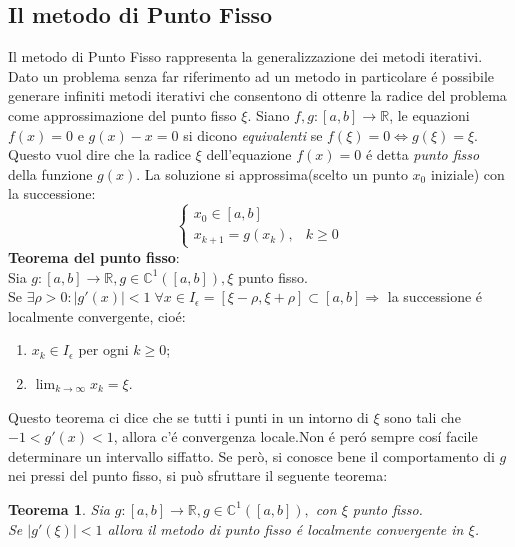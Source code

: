 \documentclass[12pt, letterpaper]{article}
\newtheorem{theorem}{Teorema}
\begin{document}
\subsection{Il metodo di Punto Fisso}
Il metodo di Punto Fisso rappresenta la generalizzazione dei metodi iterativi. Dato un problema senza far riferimento ad un metodo in particolare \'e possibile generare infiniti metodi iterativi che consentono di ottenre la radice del problema come approssimazione del punto fisso $\xi$.
Siano $f,g:[a,b] \to \mathbb{R}$, le equazioni $f(x)=0$ e $g(x)-x=0$ si dicono \textit{equivalenti} se $f(\xi)=0 \iff g(\xi) = \xi$. \\
Questo vuol dire che la radice $\xi$ dell'equazione $f(x)=0$ \'e detta \textit{punto fisso} della funzione $g(x)$.
La soluzione si approssima(scelto un punto $x_0$ iniziale) con la successione:
\begin{equation}
\begin{cases}
    x_0 \in [a,b]\\
    x_{k+1} = g(x_k),& k\geq0
\end{cases}
\end{equation}
\textbf{Teorema del punto fisso}: \\
Sia $g:[a,b] \to \mathbb{R}, g \in \mathbb{C}^1([a,b]), \xi$ punto fisso. \\ Se $\exists \rho > 0:|g'(x)|<1 \; \forall x \in I_{\epsilon} = [\xi - \rho, \xi + \rho]\subset[a,b] \Rightarrow$ la successione \'e localmente convergente, cio\'e:
\begin{enumerate}
    \item $x_k \in I_{\epsilon} $ per ogni $k \geq 0$;
    \item $\lim_{k \to \infty} x_k=\xi$.
\end{enumerate}
Questo teorema ci dice che se tutti i punti in un intorno di $\xi$ sono tali che \\ $ -1<g'(x)<1$, allora c'\'e convergenza locale.\;Non \'e per\'o sempre cos\'i facile determinare un intervallo siffatto. Se però, si conosce bene il comportamento di $g$ nei pressi del punto fisso, si può sfruttare il seguente teorema:
\begin{theorem}
    Sia $g:[a,b] \to \mathbb{R}, g \in \mathbb{C}^1([a,b]),$ con $\xi$ punto fisso. \\
    Se $|g'(\xi)|<1$ allora il metodo di punto fisso \'e localmente convergente in $\xi$.
\end{theorem}
\end{document}
